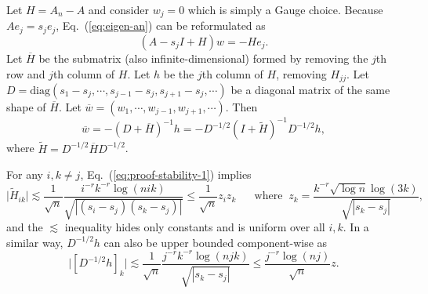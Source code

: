 \documentclass[11pt,a4paper]{article}
\renewcommand{\tilde}{\widetilde}
\renewcommand{\bar}{\overline}
\theoremstyle{definition}
\theoremstyle{plain}
\theoremstyle{remark}
\newcommand{\diag}{\mathrm{diag}}
\begin{document}
Let $H=A_n-A$ and consider $w_j=0$ which is simply a Gauge choice. Because $Ae_j=s_je_j$, Eq.~(\ref{eq:eigen-an}) can be reformulated as
$$
(A-s_j I+H)w = -He_j.
$$
Let $\bar H$ be the submatrix (also infinite-dimensional) formed by removing the $j$th row and $j$th column of $H$. Let $h$ be the $j$th column of $H$, removing $H_{jj}$.
Let $D=\diag(s_1-s_j,\cdots,s_{j-1}-s_j,s_{j+1}-s_j,\cdots)$ be a diagonal matrix of the same shape of $\bar H$. 
Let $\bar w=(w_1,\cdots,w_{j-1},w_{j+1},\cdots)$. Then
$$
\bar w = -(D+\bar H)^{-1}h = -D^{-1/2}(I+\tilde H)^{-1}D^{-1/2}h,
$$
where $\tilde H = D^{-1/2} \bar H D^{-1/2}$. 

For any $i,k\neq j$, Eq.~(\ref{eq:proof-stability-1}) implies
$$
\big|\tilde H_{ik}\big| \lesssim \frac{1}{\sqrt{n}} \frac{i^{-r}k^{-r}\log(nik)}{\sqrt{|(s_i-s_j)(s_k-s_j)|}} \leq \frac{1}{\sqrt{n}}z_iz_k\;\;\;\;\;\;\text{where}\;\; z_k = \frac{k^{-r}{\sqrt{\log n}\log(3k)}}{\sqrt{|s_k-s_j|}},
$$
and the $\lesssim$ inequality hides only constants and is uniform over all $i,k$.
In a similar way, $D^{-1/2}h$ can also be upper bounded component-wise as
\begin{equation}
\big|[D^{-1/2}h]_k \big| \lesssim  \frac{1}{\sqrt{n}}\frac{j^{-r}k^{-r}\log(njk)}{\sqrt{|s_k-s_j|}}\leq \frac{j^{-r}\log(nj)}{\sqrt{n}}z.
\label{eq:proof-stability-3}
\end{equation}
\end{document}
